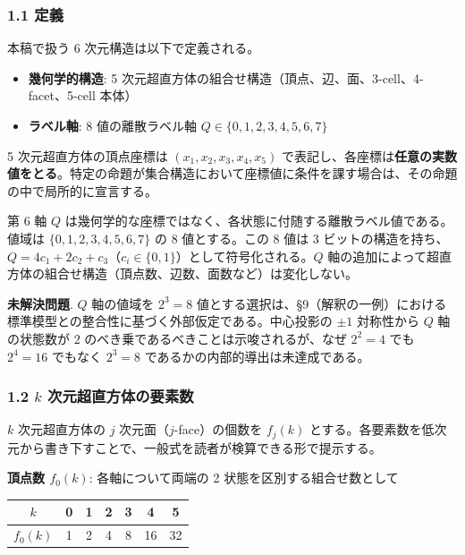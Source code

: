 \documentclass[
  a4paper,11pt]{ltjsarticle}
\newcounter{none}
\providecommand{\tightlist}{%
  \setlength{\itemsep}{0pt}\setlength{\parskip}{0pt}}
\theoremstyle{definition}
\theoremstyle{remark}
\begin{document}
\subsubsection{1.1 定義}\label{ux5b9aux7fa9}

本稿で扱う 6 次元構造は以下で定義される。

\begin{itemize}
\tightlist
\item
  \textbf{幾何学的構造}: 5
  次元超直方体の組合せ構造（頂点、辺、面、3-cell、4-facet、5-cell 本体）
\item
  \textbf{ラベル軸}: 8 値の離散ラベル軸
  \(Q \in \{0, 1, 2, 3, 4, 5, 6, 7\}\)
\end{itemize}

5 次元超直方体の頂点座標は \((x_1, x_2, x_3, x_4, x_5)\)
で表記し、各座標は\textbf{任意の実数値をとる}。特定の命題が集合構造において座標値に条件を課す場合は、その命題の中で局所的に宣言する。

第 6 軸 \(Q\)
は幾何学的な座標ではなく、各状態に付随する離散ラベル値である。値域は
\(\{0, 1, 2, 3, 4, 5, 6, 7\}\) の 8 値とする。この 8 値は 3
ビットの構造を持ち、\(Q = 4c_1 + 2c_2 + c_3\)（\(c_i \in \{0, 1\}\)）として符号化される。\(Q\)
軸の追加によって超直方体の組合せ構造（頂点数、辺数、面数など）は変化しない。

\textbf{未解決問題}. \(Q\) 軸の値域を \(2^3 = 8\)
値とする選択は、§9（解釈の一例）における標準模型との整合性に基づく外部仮定である。中心投影の
\(\pm 1\) 対称性から \(Q\) 軸の状態数が \(2\)
のべき乗であるべきことは示唆されるが、なぜ \(2^2 = 4\) でも \(2^4 = 16\)
でもなく \(2^3 = 8\) であるかの内部的導出は未達成である。

\subsubsection{\texorpdfstring{1.2 \(k\)
次元超直方体の要素数}{1.2 k 次元超直方体の要素数}}\label{k-ux6b21ux5143ux8d85ux76f4ux65b9ux4f53ux306eux8981ux7d20ux6570}

\(k\) 次元超直方体の \(j\) 次元面（\(j\)-face）の個数を \(f_j(k)\)
とする。各要素数を低次元から書き下すことで、一般式を読者が検算できる形で提示する。

\textbf{頂点数 \(f_0(k)\)}: 各軸について両端の 2
状態を区別する組合せ数として

{\def\LTcaptype{none} %
\begin{longtable}[]{@{}ccccccc@{}}
\toprule\noalign{}
\(k\) & 0 & 1 & 2 & 3 & 4 & 5 \\
\midrule\noalign{}
\endhead
\bottomrule\noalign{}
\endlastfoot
\(f_0(k)\) & 1 & 2 & 4 & 8 & 16 & 32 \\
\end{longtable}
}
\end{document}
